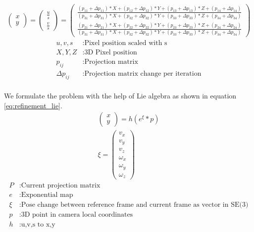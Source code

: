 \documentclass[11pt,a4paper,titlepage,oneside]{report}
\begin{document}
\begin{equation}\label{eq:refinement_projection}
  \begin{gathered}
    \begin{pmatrix}
      x \\
      y 
    \end{pmatrix}=
    \begin{pmatrix}
      \frac{u}{s} \\
      \frac{v}{s} 
    \end{pmatrix}=
    \begin{pmatrix}
      \frac{(p_{11} + \Delta p_{11})*X + (p_{12} + \Delta p_{12})*Y + (p_{13} + \Delta p_{13})*Z + (p_{14} + \Delta p_{14})}{(p_{31}+\Delta p_{31})*X + (p_{32} + \Delta p_{32})*Y + (p_{33} + \Delta p_{33})*Z + (p_{34} + \Delta p_{34})}  \\
      \frac{(p_{21} + \Delta p_{21})*X + (p_{22} + \Delta p_{22})*Y + (p_{23} + \Delta p_{23})*Z + (p_{24} + \Delta p_{24})}{(p_{31}+\Delta p_{31})*X + (p_{32} + \Delta p_{32})*Y + (p_{33} + \Delta p_{33})*Z + (p_{34} + \Delta p_{34})}
    \end{pmatrix}
  \end{gathered}
\end{equation}
\begin{align*}
  u,v,s           &:  \text{Pixel position scaled with s}\\
  X,Y,Z           &:  \text{3D Pixel position}\\
  p_{ij}          &:  \text{Projection matrix}\\
  \Delta p_{ij}   &:  \text{Projection matrix change per iteration}\\
\end{align*}

We formulate the problem with the help of Lie algebra as shown in equation \ref{eq:refinement_lie}.
\begin{equation}\label{eq:refinement_lie}
  \begin{gathered}
    \begin{pmatrix}
      x\\
      y
    \end{pmatrix}
    =h(e^{\xi}*p)\\
    \xi=\begin{pmatrix}
      v_x\\
      v_y\\
      v_z\\
      \omega_x\\
      \omega_y\\
      \omega_z
    \end{pmatrix}
  \end{gathered}
\end{equation}
\begin{align*}
  P     &: \text{Current projection matrix}\\
  e     &: \text{Exponential map}\\
  \xi   &: \text{Pose change between reference frame and current frame as vector in SE(3)}\\
  p     &: \text{3D point in camera local coordinates}\\
  h     &: \text{u,v,s to x,y}
\end{align*}
\end{document}
